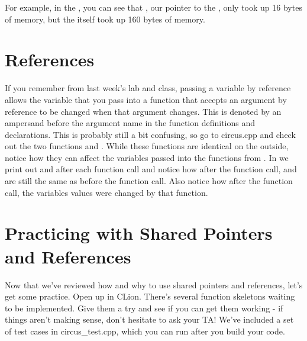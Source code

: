 \documentclass{tufte-handout}
\begin{document}
For example, in the , you can see that , our pointer to the , only took up 16 bytes of memory, but the  itself took up 160 bytes of memory. 

\section{References}
If you remember from last week's lab and class, passing a variable by reference allows the variable that you pass into a function that accepts an argument by reference to be changed when that argument changes.
This is denoted by an ampersand before the argument name in the function definitions and declarations.
This is probably still a bit confusing, so go to circus.cpp and check out the two functions  and .  
While these functions are identical on the outside, notice how they can affect the variables passed into the functions from . 
In  we print out  and  after each function call and notice how after the  function call,  and  are still the same as before the function call.
Also notice how after the  function call, the variables values were changed by that function.

\section{Practicing with Shared Pointers and References}
Now that we've reviewed how and why to use shared pointers and references, let's get some practice. Open up  in CLion. 
There's several function skeletons waiting to be implemented. 
Give them a try and see if you can get them working - if things aren't making sense, don't hesitate to ask your TA!
We've included a set of test cases in circus\_test.cpp, which you can run after you build your code. 
\end{document}
